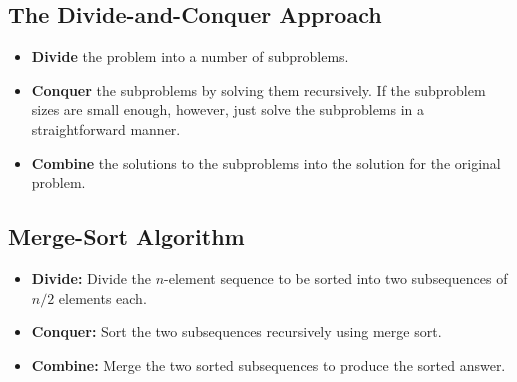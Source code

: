 \documentclass[12pt,openany]{book}
\theoremstyle{definition}
\begin{document}
	\subsection{The Divide-and-Conquer Approach}
	
	\begin{itemize}
		\item \textbf{Divide} the problem into a number of subproblems.
		\item \textbf{Conquer} the subproblems by solving them recursively. If the subproblem sizes are small enough, however, just solve the subproblems in a straightforward manner.
		\item \textbf{Combine} the solutions to the subproblems into the solution for the original problem.
	\end{itemize}
	
	\subsection{Merge-Sort Algorithm}
	
	\begin{itemize}
		\item \textbf{Divide:} Divide the \( n \)-element sequence to be sorted into two subsequences of \( n/2 \) elements each.
		\item \textbf{Conquer:} Sort the two subsequences recursively using merge sort.
		\item \textbf{Combine:} Merge the two sorted subsequences to produce the sorted answer.
	\end{itemize}
	
\end{document}
